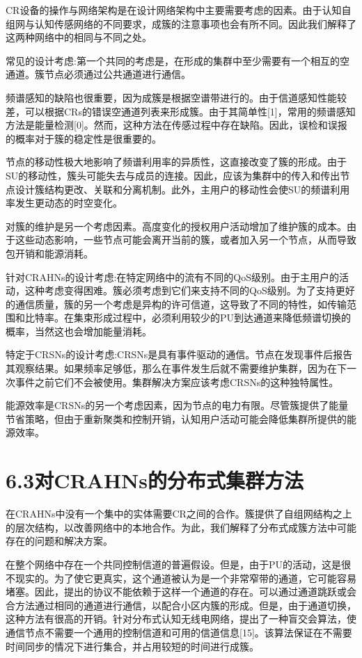 \documentclass[a4paper,AutoFakeBold,oneside,12pt]{book}
\begin{document}
  CR设备的操作与网络架构是在设计网络架构中主要需要考虑的因素。由于认知自组网与认知传感网络的不同要求，成簇的注意事项也会有所不同。因此我们解释了这两种网络中的相同与不同之处。
  
  常见的设计考虑:第一个共同的考虑是，在形成的集群中至少需要有一个相互的空通道。簇节点必须通过公共通道进行通信。

  频谱感知的缺陷也很重要，因为成簇是根据空谱带进行的。由于信道感知性能较差，可以根据CRs的错误空通道列表来形成簇。由于其简单性[1]，常用的频谱感知方法是能量检测[0]。然而，这种方法在传感过程中存在缺陷。因此，误检和误报的概率对于簇的稳定性是很重要的。

  节点的移动性极大地影响了频谱利用率的异质性，这直接改变了簇的形成。由于SU的移动性，簇头可能失去与成员的连接。因此，应该为集群中的传入和传出节点设计簇结构更改、关联和分离机制。此外，主用户的移动性会使SU的频谱利用率发生更动态的时空变化。

  对簇的维护是另一个考虑因素。高度变化的授权用户活动增加了维护簇的成本。由于这些动态影响，一些节点可能会离开当前的簇，或者加入另一个节点，从而导致包开销和能源消耗。

  针对CRAHNs的设计考虑:在特定网络中的流有不同的QoS级别。由于主用户的活动，这种考虑变得困难。簇必须考虑到它们来支持不同的QoS级别。为了支持更好的通信质量，簇的另一个考虑是异构的许可信道，这导致了不同的特性，如传输范围和比特率。在集束形成过程中，必须利用较少的PU到达通道来降低频谱切换的概率，当然这也会增加能量消耗。

  特定于CRSNs的设计考虑:CRSNs是具有事件驱动的通信。节点在发现事件后报告其观察结果。如果频率足够低，那么在事件发生后就不需要维护集群，因为在下一次事件之前它们不会被使用。集群解决方案应该考虑CRSNs的这种独特属性。

  能源效率是CRSNs的另一个考虑因素，因为节点的电力有限。尽管簇提供了能量节省策略，但由于重新聚类和控制开销，认知用户活动可能会降低集群所提供的能源效率。

\section*{6.3\quad{}对CRAHNs的分布式集群方法}


  在CRAHNs中没有一个集中的实体需要CR之间的合作。簇提供了自组网结构之上的层次结构，以改善网络中的本地合作。为此，我们解释了分布式成簇方法中可能存在的问题和解决方案。

  在整个网络中存在一个共同控制信道的普遍假设。但是，由于PU的活动，这是很不现实的。为了使它更真实，这个通道被认为是一个非常窄带的通道，它可能容易堵塞。因此，提出的协议不能依赖于这样一个通道的存在。可以通过通道跳跃或会合方法通过相同的通道进行通信，以配合小区内簇的形成。但是，由于通道切换，这种方法有很高的开销。针对分布式认知无线电网络，提出了一种盲交会算法，使通信节点不需要一个通用的控制信道和可用的信道信息[15]。该算法保证在不需要时间同步的情况下进行集合，并占用较短的时间进行成簇。
\end{document}
